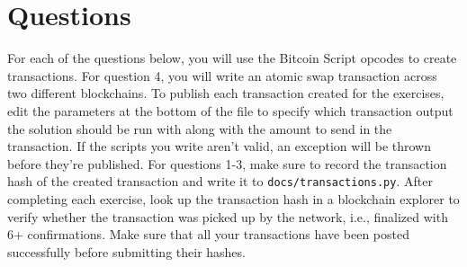 \documentclass[11pt]{article}
\begin{document}
\section{Questions}
For each of the questions below, you will use the Bitcoin Script opcodes to create transactions. For question 4, you will write an atomic swap transaction across two different blockchains. To publish each transaction created for the exercises, edit the parameters at the bottom of the file to specify which transaction output the solution should be run with along with the amount to send in the transaction. If the scripts you write aren't valid, an exception will be thrown before they're published. For questions 1-3, make sure to record the transaction hash of the created transaction and write it to \texttt{docs/transactions.py}. After completing each exercise, look up the transaction hash in a blockchain explorer to verify whether the transaction was picked up by the network, i.e., finalized with 6+ confirmations. Make sure that all your transactions have been posted successfully before submitting their hashes.
\end{document}
